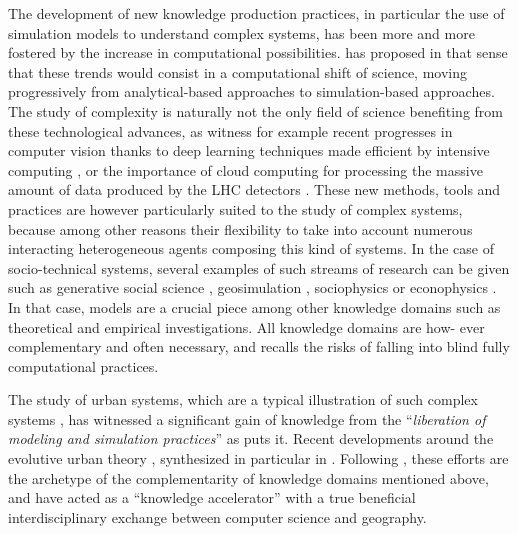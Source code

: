 \documentclass[graybox]{svmult}
\begin{document}
The development of new knowledge production practices, in particular the use of simulation models to understand complex systems, has been more and more fostered by the increase in computational possibilities. \cite{arthur2015complexity} has proposed in that sense that these trends would consist in a computational shift of science, moving progressively from analytical-based approaches to simulation-based approaches. The study of complexity is naturally not the only field of science benefiting from these technological advances, as witness for example recent progresses in computer vision thanks to deep learning techniques made efficient by intensive computing \cite{lecun2015deep}, or the importance of cloud computing for processing the massive amount of data produced by the LHC detectors \cite{bird2011computing}. These new methods, tools and practices are however particularly suited to the study of complex systems, because among other reasons their flexibility to take into account numerous interacting heterogeneous agents composing this kind of systems. In the case of socio-technical systems, several examples of such streams of research can be given such as generative social science \cite{epstein2006generative}, geosimulation \cite{benenson2004geosimulation}, sociophysics \cite{galam2008sociophysics} or econophysics \cite{mantegna1999introduction}. In that case, models are a crucial piece among other knowledge domains \cite{raimbault2017applied} such as theoretical and empirical investigations. All knowledge domains are how- ever complementary and often necessary, and \cite{raimbault2016cautious} recalls the risks of falling into blind fully computational practices.

The study of urban systems, which are a typical illustration of such complex systems \cite{batty2007cities}, has witnessed a significant gain of knowledge from the ``\textit{liberation of modeling and simulation practices}'' as \cite{banos2013pour} puts it. Recent developments around the evolutive urban theory \cite{pumain1997pour}, synthesized in particular in \cite{pumain2017urban}. Following \cite{banos2017knowledge}, these efforts are the archetype of the complementarity of knowledge domains mentioned above, and have acted as a ``knowledge accelerator'' with a true beneficial interdisciplinary exchange between computer science and geography.
\end{document}

